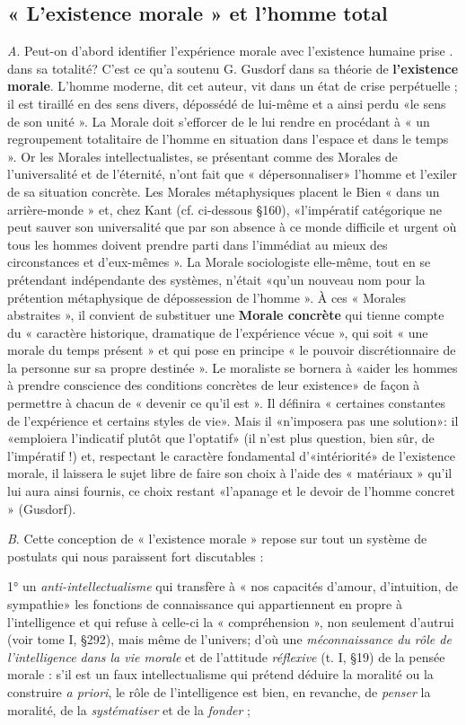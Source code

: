 \subsection{« L'existence morale » et l’homme total}%
{\it A}. Peut-on
d’abord identifier l'expérience morale avec l'existence humaine prise .
dans sa totalité? C’est ce qu’a soutenu G. Gusdorf dans sa théorie
de {\bf l'existence morale}. L'homme moderne, dit cet auteur, vit dans un
état de crise perpétuelle ; il est tiraillé en des sens divers, dépossédé de
lui-même et a ainsi perdu «le sens de son unité ». La Morale doit
s’efforcer de le lui rendre en procédant à « un regroupement totalitaire
de l’homme en situation dans l’espace et dans le temps ». Or les
Morales intellectualistes, se présentant comme des Morales de l’universalité
et de l'éternité, n’ont fait que « dépersonnaliser» l’homme
et l’exiler de sa situation concrète. Les Morales métaphysiques placent
le Bien « dans un arrière-monde » et, chez Kant (cf. ci-dessous \S 160),
«l'impératif catégorique ne peut sauver son universalité que par
son absence à ce monde difficile et urgent où tous les hommes doivent
prendre parti dans l’immédiat au mieux des circonstances et d’eux-mêmes ».
La Morale sociologiste elle-même, tout en se prétendant
indépendante des systèmes, n’était «qu’un nouveau nom pour la
prétention métaphysique de dépossession de l’homme ». À ces « Morales
abstraites », il convient de substituer une {\bf Morale concrète} qui tienne
compte du « caractère historique, dramatique de l'expérience vécue »,
qui soit « une morale du temps présent » et qui pose en principe
« le pouvoir discrétionnaire de la personne sur sa propre destinée ».
Le moraliste se bornera à «aider les hommes à prendre conscience
des conditions concrètes de leur existence» de façon à permettre
à chacun de « devenir ce qu'il est ». Il définira « certaines constantes
de l’expérience et certains styles de vie». Mais il «n’imposera pas
une solution»: il «emploiera l'indicatif plutôt que l’optatif» (il
n’est plus question, bien sûr, de l’impératif !) et, respectant le caractère
fondamental d’«intériorité» de l’existence morale, il laissera
le sujet libre de faire son choix à l’aide des « matériaux » qu’il lui aura
ainsi fournis, ce choix restant «l’apanage et le devoir de l’homme
concret » (Gusdorf).

{\it B}. Cette conception de « l’existence morale » repose sur tout un
système de postulats qui nous paraissent fort discutables :

1° un {\it anti-intellectualisme} qui transfère à « nos capacités d’amour,
d’intuition, de sympathie» les fonctions de connaissance qui appartiennent
en propre à l'intelligence et qui refuse à celle-ci la « compréhension »,
non seulement d'autrui (voir tome I, \S 292), mais
même de l’univers; d’où une {\it méconnaissance du rôle de l’intelligence
dans la vie morale} et de l'attitude {\it réflexive} (t. I, \S 19) de la
pensée morale : s’il est un faux intellectualisme qui prétend déduire
la moralité ou la construire {\it a priori}, le rôle de l’intelligence est bien,
en revanche, de {\it penser} la moralité, de la {\it systématiser} et de la {\it fonder} ;

